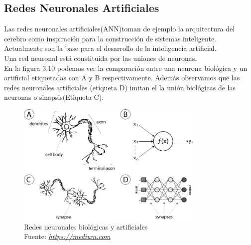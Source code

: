 \subsection{Redes Neuronales Artificiales}
Las redes neuronales artificiales(ANN)toman de ejemplo la arquitectura del cerebro como inspiración para la construcción de sistemas inteligente. Actualmente son la base para el desarrollo de la inteligencia artificial.\\
Una red neuronal está constituida por las uniones de neuronas.\\
En la figura 3.10 podemos ver la comparación entre una neurona biológica y un artificial etiquetadas con A y B respectivamente. Además observamos que las redes neuronales artificiales (etiqueta D) imitan el la unión biológicas de las neuronas o sinapsis(Etiqueta C).

\begin{figure}[H]
	\centering
	\includegraphics[width=0.8\textwidth]{Figures/ANN.png}
	\caption{Redes neuronales biológicas y artificiales \\ Fuente:  \href{https://medium.com/@ivanliljeqvist/the-essence-of-artificial-neural-networks-5de300c995d6}{\textit{https://medium.com}}}
	\label{neuronas}
\end{figure} 
